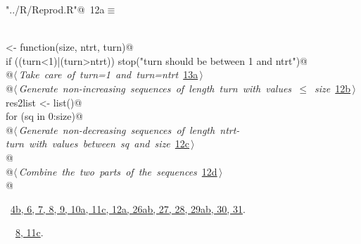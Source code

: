 \documentclass[reqno]{amsart}
\renewcommand{\NWtarget}[2]{\hypertarget{#1}{#2}}
\renewcommand{\NWlink}[2]{\hyperlink{#1}{#2}}
\begin{document}
\begin{flushleft} \small\label{scrap16}\raggedright\small
\NWtarget{nuweb12a}{} \verb@"../R/Reprod.R"@\nobreak\ {\footnotesize {12a}}$\equiv$
\vspace{-1ex}
\begin{list}{}{} \item
\mbox{}\verb@@\\
\mbox{}\verb@DownUpMatrix <- function(size, ntrt, turn){@\\
\mbox{}\verb@  if ((turn<1)|(turn>ntrt)) stop("turn should be between 1 and ntrt")@\\
\mbox{}\verb@  @\hbox{$\langle\,${\itshape Take care of turn=1 and turn=ntrt}\nobreak\ {\footnotesize \NWlink{nuweb13a}{13a}}$\,\rangle$}\verb@@\\
\mbox{}\verb@  @\hbox{$\langle\,${\itshape Generate non-increasing sequences of length turn with values $\leq$ size}\nobreak\ {\footnotesize \NWlink{nuweb12b}{12b}}$\,\rangle$}\verb@@\\
\mbox{}\verb@  res2list <- list()@\\
\mbox{}\verb@  for (sq in 0:size){@\\
\mbox{}\verb@    @\hbox{$\langle\,${\itshape Generate non-decreasing sequences of length ntrt-turn with values between sq and size}\nobreak\ {\footnotesize \NWlink{nuweb12c}{12c}}$\,\rangle$}\verb@@\\
\mbox{}\verb@  }@\\
\mbox{}\verb@  @\hbox{$\langle\,${\itshape Combine the two parts of the sequences}\nobreak\ {\footnotesize \NWlink{nuweb12d}{12d}}$\,\rangle$}\verb@@\\
\mbox{}\verb@}@\\
\mbox{}\verb@@{\NWsep}
\end{list}
\vspace{-1.5ex}
\footnotesize
\begin{list}{}{\setlength{\itemsep}{-\parsep}\setlength{\itemindent}{-\leftmargin}}
\item \NWtxtFileDefBy\ \NWlink{nuweb4b}{4b}\NWlink{nuweb6}{, 6}\NWlink{nuweb7}{, 7}\NWlink{nuweb8}{, 8}\NWlink{nuweb9}{, 9}\NWlink{nuweb10a}{, 10a}\NWlink{nuweb11c}{, 11c}\NWlink{nuweb12a}{, 12a}\NWlink{nuweb26a}{, 26a}\NWlink{nuweb26b}{b}\NWlink{nuweb27}{, 27}\NWlink{nuweb28}{, 28}\NWlink{nuweb29a}{, 29a}\NWlink{nuweb29b}{b}\NWlink{nuweb30}{, 30}\NWlink{nuweb31}{, 31}.
\item \NWtxtIdentsDefed\nobreak\  \verb@DownUpMatrix@\nobreak\ \NWlink{nuweb8}{8}\NWlink{nuweb11c}{, 11c}.
\item{}
\end{list}
\vspace{4ex}
\end{flushleft}
\end{document}
